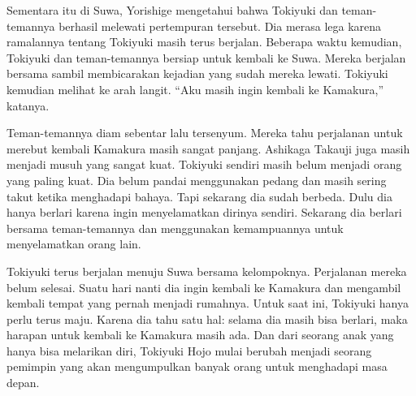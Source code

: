 Sementara itu di Suwa, Yorishige mengetahui bahwa Tokiyuki dan teman-temannya berhasil melewati pertempuran tersebut. Dia merasa lega karena ramalannya tentang Tokiyuki masih terus berjalan. Beberapa waktu kemudian, Tokiyuki dan teman-temannya bersiap untuk kembali ke Suwa. Mereka berjalan bersama sambil membicarakan kejadian yang sudah mereka lewati. Tokiyuki kemudian melihat ke arah langit.
``Aku masih ingin kembali ke Kamakura,'' katanya.

Teman-temannya diam sebentar lalu tersenyum. Mereka tahu perjalanan untuk merebut kembali Kamakura masih sangat panjang. Ashikaga Takauji juga masih menjadi musuh yang sangat kuat. Tokiyuki sendiri masih belum menjadi orang yang paling kuat. Dia belum pandai menggunakan pedang dan masih sering takut ketika menghadapi bahaya. Tapi sekarang dia sudah berbeda. Dulu dia hanya berlari karena ingin menyelamatkan dirinya sendiri. Sekarang dia berlari bersama teman-temannya dan menggunakan kemampuannya untuk menyelamatkan orang lain.

Tokiyuki terus berjalan menuju Suwa bersama kelompoknya. Perjalanan mereka belum selesai. Suatu hari nanti dia ingin kembali ke Kamakura dan mengambil kembali tempat yang pernah menjadi rumahnya. Untuk saat ini, Tokiyuki hanya perlu terus maju. Karena dia tahu satu hal: selama dia masih bisa berlari, maka harapan untuk kembali ke Kamakura masih ada. Dan dari seorang anak yang hanya bisa melarikan diri, Tokiyuki Hojo mulai berubah menjadi seorang pemimpin yang akan mengumpulkan banyak orang untuk menghadapi masa depan.

\jedahias
